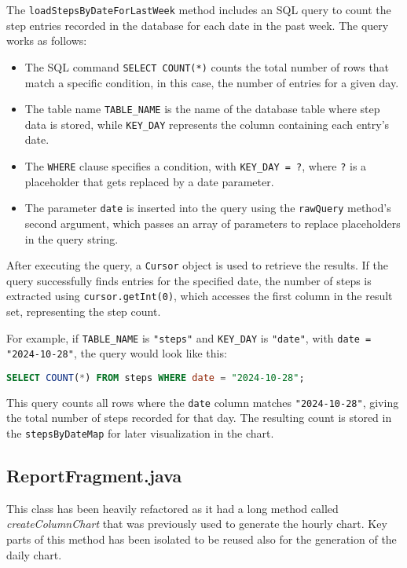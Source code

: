         The \texttt{loadStepsByDateForLastWeek} method includes an SQL query to count the step entries recorded in the database for each date in the past week. The query works as follows:
        
        \begin{itemize}
            \item The SQL command \texttt{SELECT COUNT(*)} counts the total number of rows that match a specific condition, in this case, the number of entries for a given day.
            \item The table name \texttt{TABLE\_NAME} is the name of the database table where step data is stored, while \texttt{KEY\_DAY} represents the column containing each entry's date.
            \item The \texttt{WHERE} clause specifies a condition, with \texttt{KEY\_DAY = ?}, where \texttt{?} is a placeholder that gets replaced by a date parameter.
            \item The parameter \texttt{date} is inserted into the query using the \texttt{rawQuery} method's second argument, which passes an array of parameters to replace placeholders in the query string.
        \end{itemize}
        
        After executing the query, a \texttt{Cursor} object is used to retrieve the results. If the query successfully finds entries for the specified date, the number of steps is extracted using \texttt{cursor.getInt(0)}, which accesses the first column in the result set, representing the step count.
        
        For example, if \texttt{TABLE\_NAME} is \texttt{"steps"} and \texttt{KEY\_DAY} is \texttt{"date"}, with \texttt{date = "2024-10-28"}, the query would look like this:
        
        \begin{lstlisting}[language=SQL,label={lst:query}]
            SELECT COUNT(*) FROM steps WHERE date = "2024-10-28";
        \end{lstlisting}
        
        This query counts all rows where the \texttt{date} column matches \texttt{"2024-10-28"}, giving the total number of steps recorded for that day. The resulting count is stored in the \texttt{stepsByDateMap} for later visualization in the chart.
        
\subsection{ReportFragment.java}
    This class has been heavily refactored as it had a long method called \textit{createColumnChart} that was previously used to generate the hourly chart.
    Key parts of this method has been isolated to be reused also for the generation of the daily chart.





